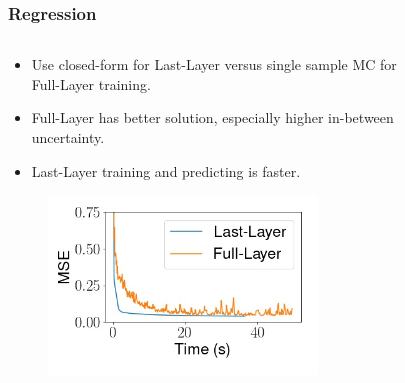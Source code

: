 \documentclass{beamer}
\begin{document}
        \begin{frame}
            \frametitle{Regression}
            \begin{columns}
                \begin{column}{0.6\textwidth}
                \begin{itemize}
                    \item Use closed-form for Last-Layer versus single sample MC for Full-Layer training.
                    \item Full-Layer has better solution, especially higher in-between uncertainty.
                    \item Last-Layer training and predicting is faster.
                \end{itemize}
                \begin{figure}
                    \includegraphics[width=0.8\textwidth]{images/Regression/LLvsFullMSE.jpg}
                \end{figure}
                \end{column}
                \begin{column}{0.4\textwidth}
                    \begin{figure}
                        \vspace*{-2cm}

\end{figure}
\end{column}
\end{columns}
\end{frame}
\end{document}

